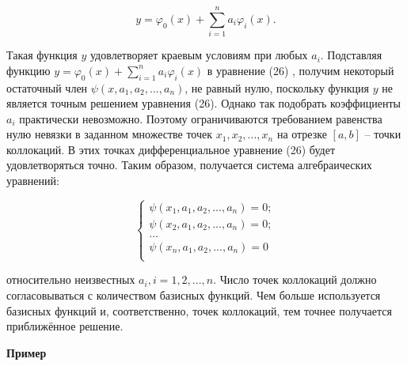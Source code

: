 \documentclass[a4paper,14pt]{article}
\begin{document}
\begin{equation*}
	y = \varphi_0(x) + \sum_{i=1}^n a_i \varphi_i(x).
\end{equation*}

Такая функция $y$ удовлетворяет краевым условиям при любых $a_i$.
Подставляя функцию $y = \varphi_0(x) + \sum_{i=1}^n a_i \varphi_i(x)$ в уравнение
(26) , получим некоторый остаточный член $\psi(x, a_1, a_2, ..., a_n)$, не равный нулю, поскольку функция 
$y$ не является точным решением уравнения (26). Однако так подобрать коэффициенты
$a_i$ практически невозможно. Поэтому ограничиваются требованием 
равенства нулю невязки в заданном множестве точек $x_1, x_2, ..., x_n$ на отрезке
$[a, b]$ -- точки коллокаций. В этих точках дифференциальное уравнение
(26) будет удовлетворяться точно. Таким образом, получается система
алгебраических уравнений:

\begin{equation}
	\begin{cases}
		\psi(x_1, a_1, a_2, ..., a_n) = 0; \\
		\psi(x_2, a_1, a_2, ..., a_n) = 0; \\
		\dots \\
		\psi(x_n, a_1, a_2, ..., a_n) = 0 \\
	\end{cases}
\end{equation}

относительно неизвестных $a_i, i = 1, 2, ..., n$. 
Число точек коллокаций должно согласовываться с количеством базисных
функций. Чем больше используется базисных функций и, соответственно, 
точек коллокаций, тем точнее получается приближённое решение.

\textbf{Пример}

\begin{figure}[!h]
	\label{fig:kollok_prim1}
\end{figure}
\end{document}
